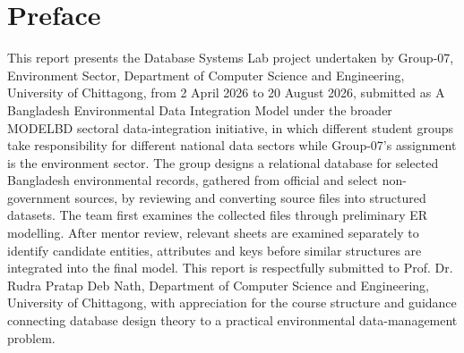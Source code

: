 \section*{Preface}

This report presents the Database Systems Lab project undertaken by Group-07, Environment Sector, Department of Computer Science and Engineering, University of Chittagong, from 2 April 2026 to 20 August 2026, submitted as A Bangladesh Environmental Data Integration Model under the broader MODELBD sectoral data-integration initiative, in which different student groups take responsibility for different national data sectors while Group-07's assignment is the environment sector. The group designs a relational database for selected Bangladesh environmental records, gathered from official and select non-government sources, by reviewing and converting source files into structured datasets. The team
first examines the collected files through preliminary ER modelling. After
mentor review, relevant sheets are examined separately to identify candidate
entities, attributes and keys before similar structures are integrated into the
final model. This report is respectfully submitted to Prof. Dr. Rudra Pratap
Deb Nath, Department of Computer Science and Engineering, University of
Chittagong, with appreciation for the course structure and guidance connecting
database design theory to a practical environmental data-management problem.